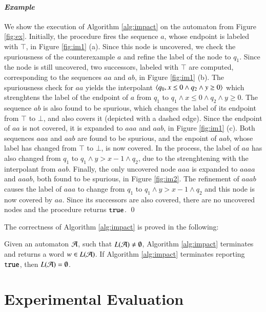 \documentclass[10pt,conference,letterpaper,twocolumn]{IEEEtran}
\begin{document}
\paragraph{\em Example}
We show the execution of Algorithm \ref{alg:impact} on the automaton
from Figure \ref{fig:ex}.  Initially, the procedure fires the sequence
$a$, whose endpoint is labeled with $\top$, in Figure \ref{fig:im1}
(a). Since this node is uncovered, we check the spuriousness of the
counterexample $a$ and refine the label of the node to $q_1$. Since
the node is still uncovered, two successors, labeled with $\top$ are
computed, corresponding to the sequences $aa$ and $ab$, in Figure
\ref{fig:im1} (b). The spuriousness check for $aa$ yields the
interpolant $\left\langle q_0,x\leq0\wedge q_2 \wedge y\geq0 \right\rangle$ which
strenghtens the label of the endpoint of $a$ from $q_1$ to $q_1\wedge
x\leq0\wedge q_2\wedge y\geq0$. The sequence $ab$ is also found to be
spurious, which changes the label of its endpoint from $\top$ to
$\bot$, and also covers it (depicted with a dashed edge). Since the
endpoint of $aa$ is not covered, it is expanded to $aaa$ and $aab$, in
Figure \ref{fig:im1} (c). Both sequences $aaa$ and $aab$ are found to
be spurious, and the enpoint of $aab$, whose label has changed from
$\top$ to $\bot$, is now covered. In the process, the label of $aa$
has also changed from $q_1$ to $q_1 \wedge y>x-1 \wedge q_2$, due to
the strenghtening with the interpolant from $aab$.  Finally, the only
uncovered node $aaa$ is expanded to $aaaa$ and $aaab$, both found to be
spurious, in Figure \ref{fig:im2}. The refinement of $aaab$ causes
the label of $aaa$ to change from $q_1$ to $q_1 \wedge y>x-1 \wedge
q_2$ and this node is now covered by $aa$. Since its successors are
also covered, there are no uncovered nodes and the procedure returns
$\mathtt{true}$. \qed

The correctness of Algorithm \ref{alg:impact} is proved in the
following:

\begin{theorem}\label{thm:impact}
  Given an automaton $\mathcal{A}$, such that $L(\mathcal{A}) \neq \emptyset$, Algorithm
  \ref{alg:impact} terminates and returns a word $w \in L(\mathcal{A})$. If
  Algorithm \ref{alg:impact} terminates reporting $\mathtt{true}$, then
  $L(\mathcal{A}) = \emptyset$.
\end{theorem}

\section{Experimental Evaluation}
\end{document}

